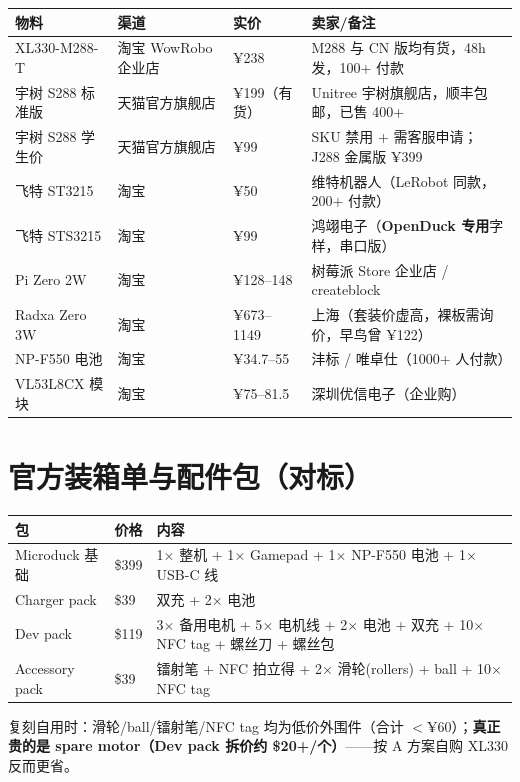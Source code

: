 \documentclass[11pt,a4paper]{ctexart}
\newcommand{\good}[1]{\textcolor{green!55!black}{#1}}
\newcommand{\warn}[1]{\textcolor{orange!85!black}{#1}}
\begin{document}
\begin{longtable}{L{4.2cm}L{3.0cm}L{2.6cm}L{5.0cm}}
\toprule
\textbf{物料} & \textbf{渠道} & \textbf{实价} & \textbf{卖家/备注} \\
\midrule
XL330-M288-T & 淘宝 WowRobo 企业店 & \good{¥238} & M288 与 CN 版均有货，48h 发，100+ 付款 \\
宇树 S288 标准版 & 天猫官方旗舰店 & \good{¥199（有货）} & Unitree 宇树旗舰店，顺丰包邮，已售 400+ \\
宇树 S288 学生价 & 天猫官方旗舰店 & ¥99 & \warn{SKU 禁用 + 需客服申请}；J288 金属版 ¥399 \\
飞特 ST3215 & 淘宝 & ¥50 & 维特机器人（LeRobot 同款，200+ 付款） \\
飞特 STS3215 & 淘宝 & ¥99 & 鸿翊电子（\textbf{OpenDuck 专用}字样，串口版） \\
Pi Zero 2W & 淘宝 & ¥128--148 & 树莓派 Store 企业店 / createblock \\
Radxa Zero 3W & 淘宝 & ¥673--1149 & 上海（套装价虚高，裸板需询价，早鸟曾 ¥122） \\
NP-F550 电池 & 淘宝 & ¥34.7--55 & 沣标 / 唯卓仕（1000+ 人付款） \\
VL53L8CX 模块 & 淘宝 & ¥75--81.5 & 深圳优信电子（企业购） \\
\bottomrule
\end{longtable}
\section{官方装箱单与配件包（对标）}

\begin{longtable}{L{3.4cm}L{2.0cm}L{9.4cm}}
\toprule
\textbf{包} & \textbf{价格} & \textbf{内容} \\
\midrule
Microduck 基础 & \$399 & 1$\times$ 整机 + 1$\times$ Gamepad + 1$\times$ NP-F550 电池 + 1$\times$ USB-C 线 \\
Charger pack & \$39 & 双充 + 2$\times$ 电池 \\
Dev pack & \$119 & 3$\times$ 备用电机 + 5$\times$ 电机线 + 2$\times$ 电池 + 双充 + 10$\times$ NFC tag + 螺丝刀 + 螺丝包 \\
Accessory pack & \$39 & 镭射笔 + NFC 拍立得 + 2$\times$ 滑轮(rollers) + ball + 10$\times$ NFC tag \\
\bottomrule
\end{longtable}

\noindent 复刻自用时：滑轮/ball/镭射笔/NFC tag 均为低价外围件（合计 $<$¥60）；\textbf{真正贵的是 spare motor（Dev pack 拆价约 \$20+/个）}——按 A 方案自购 XL330 反而更省。
\end{document}
